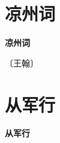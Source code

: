 \documentclass[12pt,UTF-8,openany,fontset=none]{ctexbook}
\begin{document}
\vspace{8pt}
\clearpage

\section{凉州词}



\begin{center}
    {\bfseries 凉州词}
\end{center}

\begin{center}
    \vspace{10pt}
    
    \begin{large}
        
        〔王翰〕
        
    \end{large}
    
    \vspace{8pt}
    
    \begin{huge}
        
        \phantom{。}

        \phantom{。}
        
        \phantom{。}

        \phantom{。}
        
    \end{huge}
    
\end{center}

\vspace{8pt}
\clearpage


\section{从军行}



\begin{center}
    {\bfseries 从军行}
\end{center}
\end{document}
